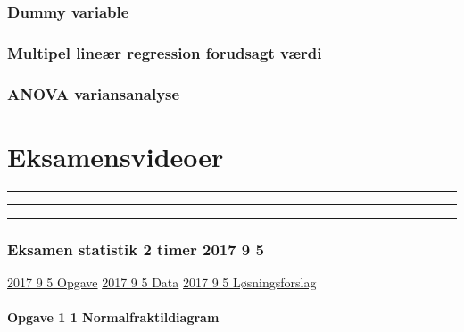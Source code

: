 \documentclass[]{book}
\let\oldparagraph\paragraph
\renewcommand{\paragraph}[1]{\oldparagraph{#1}\mbox{}}
\begin{document}
\hypertarget{dummy-variable}{%
\subsubsection{Dummy variable}\label{dummy-variable}}

\hypertarget{multipel-liner-regression-forudsagt-vrdi}{%
\subsubsection{Multipel lineær regression forudsagt værdi}\label{multipel-liner-regression-forudsagt-vrdi}}

\hypertarget{anova-variansanalyse}{%
\subsubsection{ANOVA variansanalyse}\label{anova-variansanalyse}}

\hypertarget{eksamensvideoer}{%
\section{Eksamensvideoer}\label{eksamensvideoer}}

\begin{center}\rule{0.5\linewidth}{\linethickness}\end{center}

\begin{center}\rule{0.5\linewidth}{\linethickness}\end{center}

\begin{center}\rule{0.5\linewidth}{\linethickness}\end{center}

\hypertarget{eksamen-statistik-2-timer-2017-9-5}{%
\subsubsection{Eksamen statistik 2 timer 2017 9 5}\label{eksamen-statistik-2-timer-2017-9-5}}

\href{https://www.dropbox.com/s/3gd6mcocowe8glq/2017\%209\%20Statistik\%20Fin.pdf?dl=1}{2017 9 5 Opgave}
\href{https://www.dropbox.com/s/y4p8j90wjbzhtb3/2017\%209\%20statistik\%20Data\%202.RE.xlsx?dl=1}{2017 9 5 Data}
\href{https://www.dropbox.com/s/wruqocv7g0fvkob/2017\%209\%20Statistik\%20Fin\%20opg\%201\%20og\%203\%20l\%C3\%B8sning\%20skabelon\%20Freestat\%20.docx?dl=1}{2017 9 5 Løsningsforslag}

\hypertarget{opgave-1-1-normalfraktildiagram}{%
\paragraph{Opgave 1 1 Normalfraktildiagram}\label{opgave-1-1-normalfraktildiagram}}
\end{document}
